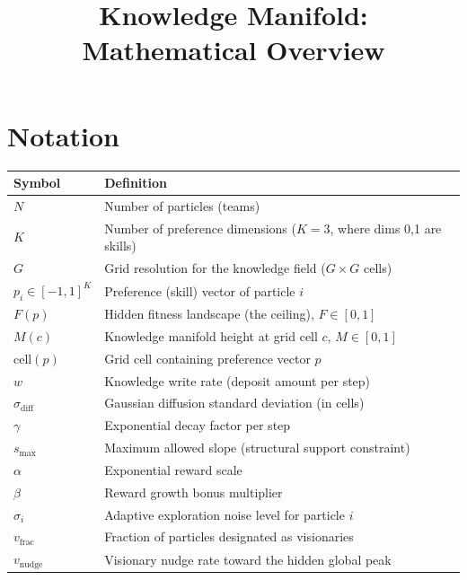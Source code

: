 \documentclass[11pt,a4paper]{article}
\title{\vspace{-2cm}Knowledge Manifold:\\Mathematical Overview}
\date{}
\author{}
\begin{document}
\maketitle
\vspace{-1.5cm}

\tableofcontents
\vspace{0.5cm}

\section{Notation}

\begin{table}[H]
\centering
\begin{tabular}{ll}
\toprule
\textbf{Symbol} & \textbf{Definition} \\
\midrule
$N$ & Number of particles (teams) \\
$K$ & Number of preference dimensions ($K=3$, where dims 0,1 are skills) \\
$G$ & Grid resolution for the knowledge field ($G \times G$ cells) \\
$p_i \in [-1, 1]^K$ & Preference (skill) vector of particle $i$ \\
$F(p)$ & Hidden fitness landscape (the ceiling), $F \in [0, 1]$ \\
$M(c)$ & Knowledge manifold height at grid cell $c$, $M \in [0, 1]$ \\
$\text{cell}(p)$ & Grid cell containing preference vector $p$ \\
$w$ & Knowledge write rate (deposit amount per step) \\
$\sigma_{\text{diff}}$ & Gaussian diffusion standard deviation (in cells) \\
$\gamma$ & Exponential decay factor per step \\
$s_{\text{max}}$ & Maximum allowed slope (structural support constraint) \\
$\alpha$ & Exponential reward scale \\
$\beta$ & Reward growth bonus multiplier \\
$\sigma_i$ & Adaptive exploration noise level for particle $i$ \\
$v_{\text{frac}}$ & Fraction of particles designated as visionaries \\
$v_{\text{nudge}}$ & Visionary nudge rate toward the hidden global peak \\
\bottomrule
\end{tabular}
\end{table}
\end{document}
